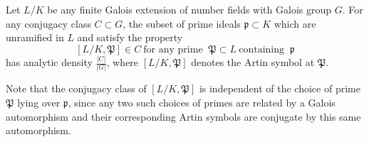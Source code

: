 \documentclass[12pt]{article}
\begin{document}
Let $L/K$ be any finite Galois extension of number fields with Galois group $G$. For any conjugacy class $C \subset G$, the subset of prime ideals $\mathfrak{p} \subset K$ which are unramified in $L$ and satisfy the property
$$
[L/K,\mathfrak{P}] \in C\ \text{for any prime }\ \mathfrak{P} \subset L\ \text{containing }\ \mathfrak{p}
$$
has analytic density $\frac{|C|}{|G|}$, where $[L/K,\mathfrak{P}]$ denotes the Artin symbol at $\mathfrak{P}$.

Note that the conjugacy class of $[L/K,\mathfrak{P}]$ is independent of the choice of prime $\mathfrak{P}$ lying over $\mathfrak{p}$, since any two such choices of primes are related by a Galois automorphism and their corresponding Artin symbols are conjugate by this same automorphism.
\end{document}
